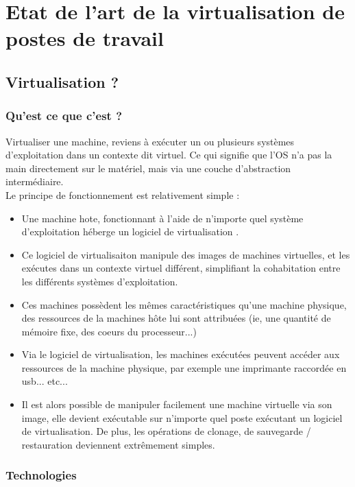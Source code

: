\section{Etat de l'art de la virtualisation de postes de travail}

\subsection{Virtualisation ?}

\subsubsection{Qu'est ce que c'est ?}

Virtualiser une machine, reviens à exécuter un ou plusieurs systèmes d'exploitation dans un contexte dit virtuel. Ce qui signifie que l'OS n'a pas la main directement sur le matériel, mais via une couche d'abstraction intermédiaire.\\ 

Le principe de fonctionnement est relativement simple : \\
\begin{itemize}
\item  Une machine hote, fonctionnant à l'aide de n'importe quel système d'exploitation héberge un logiciel de virtualisation .
\item Ce logiciel de virtualisaiton manipule des images de machines virtuelles, et les exécutes dans un contexte virtuel différent, simplifiant la cohabitation entre les différents systèmes d'exploitation.
\item Ces machines possèdent les mêmes caractéristiques qu'une machine physique, des ressources de la machines hôte lui sont attribuées (ie, une quantité de mémoire fixe,  des coeurs du processeur...)
\item Via le logiciel de virtualisation, les machines exécutées peuvent accéder aux ressources de la machine physique, par exemple une imprimante raccordée en usb... etc...
\item Il est alors possible de manipuler facilement une machine virtuelle via son image, elle devient exécutable sur n'importe quel poste exécutant un logiciel de virtualisation. De plus, les opérations de clonage, de sauvegarde / restauration deviennent extrêmement simples.
\end{itemize}

\subsubsection{Technologies}

